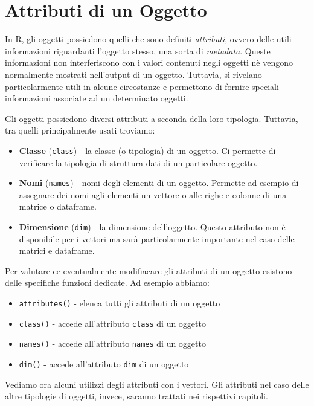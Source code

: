 \documentclass[
]{book}
\providecommand{\tightlist}{%
  \setlength{\itemsep}{0pt}\setlength{\parskip}{0pt}}
\begin{document}
\hypertarget{attributes}{%
\section{Attributi di un Oggetto}\label{attributes}}

In R, gli oggetti possiedono quelli che sono definiti \emph{attributi}, ovvero delle utili informazioni riguardanti l'oggetto stesso, una sorta di \emph{metadata}. Queste informazioni non interferiscono con i valori contenuti negli oggetti nè vengono normalmente mostrati nell'output di un oggetto. Tuttavia, si rivelano particolarmente utili in alcune circostanze e permettono di fornire speciali informazioni associate ad un determinato oggetti.

Gli oggetti possiedono diversi attributi a seconda della loro tipologia. Tuttavia, tra quelli principalmente usati troviamo:

\begin{itemize}
\tightlist
\item
  \textbf{Classe} (\texttt{class}) - la classe (o tipologia) di un oggetto. Ci permette di verificare la tipologia di struttura dati di un particolare oggetto.
\item
  \textbf{Nomi} (\texttt{names}) - nomi degli elementi di un oggetto. Permette ad esempio di assegnare dei nomi agli elementi un vettore o alle righe e colonne di una matrice o dataframe.
\item
  \textbf{Dimensione} (\texttt{dim}) - la dimensione dell'oggetto. Questo attributo non è disponibile per i vettori ma sarà particolarmente importante nel caso delle matrici e dataframe.
\end{itemize}

Per valutare ee eventualmente modifiacare gli attributi di un oggetto esistono delle specifiche funzioni dedicate. Ad esempio abbiamo:

\begin{itemize}
\tightlist
\item
  \texttt{attributes()} - elenca tutti gli attributi di un oggetto
\item
  \texttt{class()} - accede all'attributo \texttt{class} di un oggetto
\item
  \texttt{names()} - accede all'attributo \texttt{names} di un oggetto
\item
  \texttt{dim()} - accede all'attributo \texttt{dim} di un oggetto
\end{itemize}

Vediamo ora alcuni utilizzi degli attributi con i vettori. Gli attributi nel caso delle altre tipologie di oggetti, invece, saranno trattati nei rispettivi capitoli.
\end{document}
